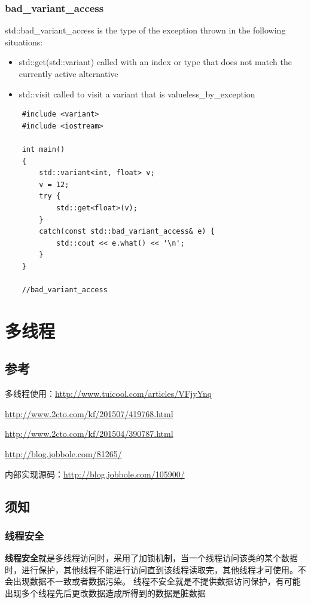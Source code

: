 \documentclass[UTF8,a4paper,12pt]{ctexbook}
\begin{document}
		\subsection{bad\_variant\_access}
			std::bad\_variant\_access is the type of the exception thrown in the following situations: 
			\begin{itemize}
				\item std::get(std::variant) called with an index or type that does not match the currently active alternative 
				\item  std::visit called to visit a variant that is valueless\_by\_exception 
			\end{itemize}
\begin{lstlisting}
	#include <variant>
	#include <iostream>
	
	int main()
	{
		std::variant<int, float> v;
		v = 12;
		try {
			std::get<float>(v);
		}
		catch(const std::bad_variant_access& e) {
			std::cout << e.what() << '\n';
		}
	}
	
	//bad_variant_access
\end{lstlisting}

\chapter{多线程}
\section{参考}
	多线程使用：\url{http://www.tuicool.com/articles/VFjyYnq}
		
		\url{http://www.2cto.com/kf/201507/419768.html}
		
		\url{http://www.2cto.com/kf/201504/390787.html}
		
		\url{http://blog.jobbole.com/81265/}
	
	内部实现源码：\url{http://blog.jobbole.com/105900/}
	
\section{须知}
	\subsection{线程安全}
		\textbf{线程安全}就是多线程访问时，采用了加锁机制，当一个线程访问该类的某个数据时，进行保护，其他线程不能进行访问直到该线程读取完，其他线程才可使用。不会出现数据不一致或者数据污染。 线程不安全就是不提供数据访问保护，有可能出现多个线程先后更改数据造成所得到的数据是脏数据
		
\end{document}
